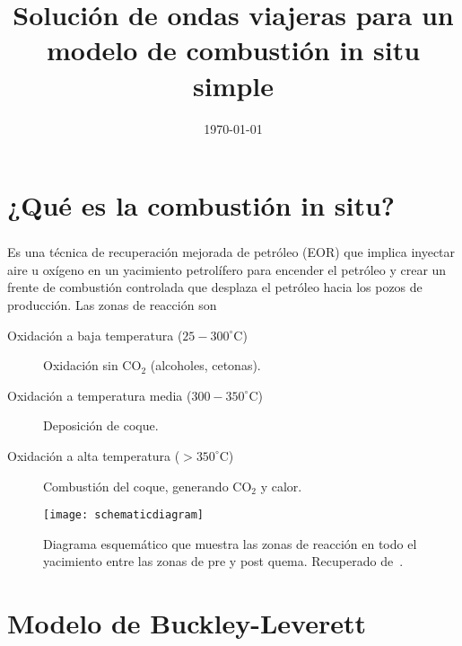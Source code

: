 \documentclass[
  aspectratio=1610,
  c,
  handout,
  9pt,
  spanish
]{beamer}
\title{Solución de ondas viajeras para un modelo de combustión in situ simple}
\subtitle{}
\institute{}
\author{\scshape\name}
\date{\today}
\begin{document}
\begin{frame}
    \maketitle
\end{frame}

\section{¿Qué es la combustión in situ?~\cite{Storey2022}}

\begin{frame}
    \frametitle{\secname}

    Es una técnica de \alert{recuperación mejorada de petróleo} (EOR)
    que implica inyectar aire u oxígeno en un yacimiento petrolífero
    para encender el petróleo y crear un frente de combustión
    controlada que desplaza el petróleo hacia los pozos de
    producción.
    Las zonas de reacción son
    \begin{description}
        \item[Oxidación a baja temperatura ($25-300^{\circ}$C)]

              Oxidación sin CO$_{2}$ (alcoholes, cetonas).

        \item[Oxidación a temperatura media ($300-350^{\circ}$C)]

              Deposición de coque.

        \item[Oxidación a alta temperatura ($>350^{\circ}$C)]
              Combustión del coque, generando CO$_{2}$ y calor.
    \end{description}

    \begin{figure}[ht!]
        \centering
        \texttt{[image: schematicdiagram]}
        \caption{Diagrama esquemático que muestra las zonas de
            reacción en todo el yacimiento entre las zonas de pre y post
            quema.
            Recuperado de~\cite{Storey2022}.}
    \end{figure}
\end{frame}

\section{Modelo de Buckley-Leverett~\cite{booth2008a}}
\end{document}

